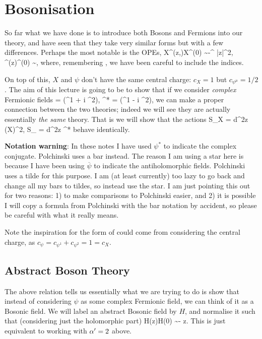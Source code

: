\chapter{Bosonisation}

So far what we have done is to introduce both Bosons and Fermions into our theory, and have seen that they take very similar forms but with a few differences. Perhaps the most notable is the OPEs,
\bse
    X^\mu(z,)X^\nu(0) \sim -\eta^{\mu\nu} \ln |z|^2, \qquad \psi^{\mu}(z)\psi^{\nu}(0) \sim {},
\ese
where, remembering , we have been careful to include the indices.

On top of this, $X$ and $\psi$ don't have the same central charge: $c_X=1$ but $c_{\psi^{\mu}}=1/2$. The aim of this lecture is going to be to show that if we consider \textit{complex} Fermionic fields 
\be 
\label{eqn:ComplexFermions}
    \psi = \big(\psi^1 + i \psi^2\big), \qquad \psi^* = \big(\psi^1 - i \psi^2\big),
\ee 
we can make a proper connection between the two theories; indeed we will see they are actually essentially \textit{the same} theory. That is we will show that the actions 
\bse 
    S_X =  \int d^2z (\p X)^2, \qand S_{\psi} =  \int d^2z \psi^*\p \psi
\ese
behave identically.

\br 
    \textbf{Notation warning}: In these notes I have used $\psi^*$ to indicate the complex conjugate. Polchinski uses a bar instead. The reason I am using a star here is because I have been using $\overline{\psi}$ to indicate the antiholomorphic fields. Polchinski uses a tilde for this purpose. I am (at least currently) too lazy to go back and change all my bars to tildes, so instead use the star. I am just pointing this out for two reasons: 1) to make comparisons to Polchinski easier, and 2) it is possible I will copy a formula from Polchinski with the bar notation by accident, so please be careful with what it really means. 
\er 

\br 
    Note the inspiration for the form of  could come from considering the central charge, as $c_{\psi} = c_{\psi^1}+c_{\psi^2} = 1 = c_X$.
\er 

\section{Abstract Boson Theory}

The above relation tells us essentially what we are trying to do is show that instead of considering $\psi$ as some complex Fermionic field, we can think of it as a Bosonic field. We will label an abstract Bosonic field by $H$, and normalise it such that (considering just the holomorphic part)
\be 
\label{eqn:HHOPE}
    H(z)H(0) \sim - \ln z.
\ee 
This is just equivalent to working with $\alpha'=2$ above. 

